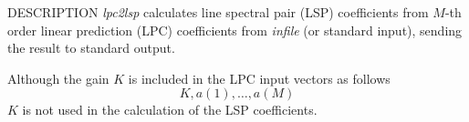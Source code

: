 \begin{synopsis}
\item [lpc2lsp] [ --m $M$ ] [ --s $S$ ] [ --k ] [ --l ] [ --o $O$ ] [ --n $N$ ]
		[ --p $P$ ] [ --q $Q$ ] [ --d $D$ ] 
\item [\ ~~~~~~~~] [ {\em infile} ] 
\end{synopsis}

\begin{qsection}{DESCRIPTION}
{\em lpc2lsp} calculates line spectral pair (LSP) coefficients 
from $M$-th order linear prediction (LPC) coefficients 
from {\em infile} (or standard input),
sending the result to standard output.

Although the gain $K$ is included in the LPC input vectors as follows
\begin{displaymath}
  K, a(1), \dots, a(M)
\end{displaymath}
$K$ is not used in the calculation of the LSP coefficients.


\end{qsection}
